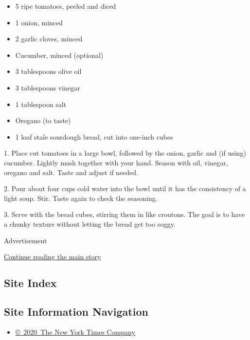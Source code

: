 \begin{itemize}
\item
  5 ripe tomatoes, peeled and diced
\item
  1 onion, minced
\item
  2 garlic cloves, minced
\item
  Cucumber, minced (optional)
\item
  3 tablespoons olive oil
\item
  3 tablespoons vinegar
\item
  1 tablespoon salt
\item
  Oregano (to taste)
\item
  1 loaf stale sourdough bread, cut into one-inch cubes
\end{itemize}

1. Place cut tomatoes in a large bowl, followed by the onion, garlic and
(if using) cucumber. Lightly mash together with your hand. Season with
oil, vinegar, oregano and salt. Taste and adjust if needed.

2. Pour about four cups cold water into the bowl until it has the
consistency of a light soup. Stir. Taste again to check the seasoning.

3. Serve with the bread cubes, stirring them in like croutons. The goal
is to have a chunky texture without letting the bread get too soggy.

Advertisement

\protect\hyperlink{after-bottom}{Continue reading the main story}

\hypertarget{site-index}{%
\subsection{Site Index}\label{site-index}}

\hypertarget{site-information-navigation}{%
\subsection{Site Information
Navigation}\label{site-information-navigation}}

\begin{itemize}
\tightlist
\item
  \href{https://help.nytimes3xbfgragh.onion/hc/en-us/articles/115014792127-Copyright-notice}{©~2020~The
  New York Times Company}
\end{itemize}

